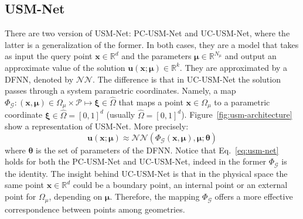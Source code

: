 \documentclass[11pt]{article}
\begin{document}
\subsection{USM-Net}\label{sec:usmnet}
There are two version of USM-Net: PC-USM-Net and UC-USM-Net, where the latter is a generalization of the former. In both cases, they are a model that takes as input the query point $\mathbf x\in\mathbb R^d$ and the parameters $\boldsymbol \mu \in \mathbb R^{N_\mu}$ and output an approximate value of the solution $\mathbf u(\mathbf x;\boldsymbol \mu) \in \mathbb R^k$. They are approximated by a DFNN, denoted by $\mathcal{NN}$.
The difference is that in UC-USM-Net the solution passes through a system parametric coordinates. Namely, a map $\Phi_{\mathcal G}: (\mathbf x, \boldsymbol \mu) \in \Omega_\mu \times \mathcal P \mapsto \boldsymbol \xi \in \hat\Omega$ that maps a point $\mathbf x \in \Omega_\mu$ to a parametric coordinate $\boldsymbol \xi \in \hat\Omega=[0, 1]^d$ (usually $\hat\Omega=[0, 1]^d$). Figure~\ref{fig:usm-architecture} show a representation of USM-Net. More precisely:
\begin{equation}
    \mathbf u(\mathbf x;\boldsymbol \mu)\approx \mathcal{NN}(\Phi_{\mathcal G}(\mathbf x, \boldsymbol \mu), \boldsymbol \mu; \boldsymbol \theta)
\label{eq:usm-net}
\end{equation}
where $\boldsymbol \theta$ is the set of parameters of the DFNN. Notice that Eq.~\ref{eq:usm-net} holds for both the PC-USM-Net and UC-USM-Net, indeed in the former $\Phi_{\mathcal G}$ is the identity. The insight behind UC-USM-Net is that in the physical space the same point $\mathbf x \in \mathbb R^d$ could be a boundary point, an internal point or an external point for $\Omega_\mu$, depending on $\boldsymbol \mu$. Therefore, the mapping $\Phi_{\mathcal G}$ offers a more effective correspondence between points among geometries. 
\end{document}
